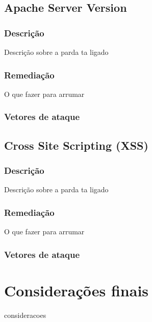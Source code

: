 \documentclass{ufscThesis}
\newcommand{\+}{\discretionary{\mbox{${\bm\cdot}\mkern-1mu$}}{}{}}
\renewcommand\+{\discretionary{}{}{}}
\begin{document}
\section{Apache Server Version}

\subsection{Descrição}

Descrição sobre a parda ta ligado

\subsection{Remediação}

O que fazer para arrumar

\subsection{Vetores de ataque}

\section{Cross Site Scripting (XSS)}

\subsection{Descrição}

Descrição sobre a parda ta ligado

\subsection{Remediação}

O que fazer para arrumar

\subsection{Vetores de ataque}



\chapter{Considerações finais}
consideracoes
\end{document}
